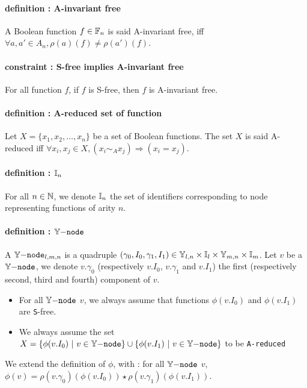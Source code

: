\documentclass[a4paper,10pt]{article}
\begin{document}
\paragraph{definition : A-invariant free\\}
A Boolean function $f\in\mathbb{F}_n$ is said A-invariant free, iff $\forall a, a'\in A_n, \rho(a)(f) \neq \rho(a')(f)$.

\paragraph{constraint : S-free implies A-invariant free\\}
For all function $f$, if $f$ is S-free, then $f$ is A-invariant free.

\paragraph{definition : A-reduced set of function\\}
Let $X = \{x_1, x_2, \dots, x_n\}$ be a set of Boolean functions.
The set $X$ is said A-reduced iff $\forall x_i, x_j \in X, (x_i \sim_A x_j) \Rightarrow (x_i = x_j)$.

\paragraph{definition : $\mathbb{I}_n$\\}
For all $n\in\mathbb{N}$, we denote $\mathbb{I}_n$ the set of identifiers corresponding to node representing functions of arity $n$.

\paragraph{definition : $\mathbb{Y}\mathtt{-node}$\\}
A $\mathbb{Y}\mathtt{-node}_{l, m, n}$ is a quadruple $(\gamma_0, I_0, \gamma_1, I_1) \in \mathbb{Y}_{l, n} \times \mathbb{I}_l \times \mathbb{Y}_{m, n} \times \mathbb{I}_m$. Let $v$ be a $\mathbb{Y}\mathtt{-node}$, we denote $v.\gamma_0$ (respectively $v.I_0$, $v.\gamma_1$ and $v.I_1$) the first (respectively second, third and fourth) component of $v$.
\begin{itemize}
\item For all $\mathbb{Y}\mathtt{-node}$ $v$, we always assume that functions $\phi(v.I_0)$ and $\phi(v.I_1)$ are \texttt{S}-free.
\item We always assume the set $X = \{\phi(v.I_0) ~|~ v \in\mathbb{Y}\mathtt{-node}\} \cup \{\phi(v.I_1) ~|~ v\in\mathbb{Y}\mathtt{-node}\}$ to be \texttt{A-reduced}
\end{itemize}
We extend the definition of $\phi$, with : for all $\mathbb{Y}\mathtt{-node}$ $v$, $\phi(v) = \rho(v.\gamma_0)(\phi(v.I_0)) \star \rho(v.\gamma_1)(\phi(v.I_1))$.
\end{document}
